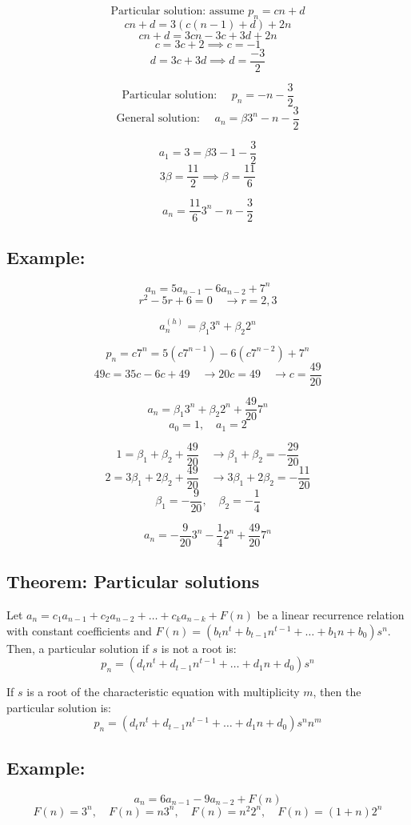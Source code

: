 \documentclass[11pt]{article}
\begin{document}
\[
\text{Particular solution: assume } p_n = cn + d
\]
\[
cn + d = 3(c(n-1) + d) + 2n
\]
\[
cn + d = 3cn - 3c + 3d + 2n
\]
\[
c = 3c + 2 \implies c = -1
\]
\[
d = 3c + 3d \implies d = \frac{-3}{2}
\]

\[
\text{Particular solution: } \quad p_n = -n - \frac{3}{2}
\]
\[
\text{General solution: } \quad a_n = \beta 3^n - n - \frac{3}{2}
\]

\[
a_1 = 3 = \beta 3 - 1 - \frac{3}{2} 
\]
\[
3 \beta = \frac{11}{2} \implies \beta = \frac{11}{6}
\]

\[
a_n = \frac{11}{6} 3^n - n - \frac{3}{2}
\]

\subsection*{Example:}
\[
a_n = 5 a_{n-1} - 6 a_{n-2} + 7^n
\]
\[
r^2 - 5r + 6 = 0 \quad \rightarrow r = 2, 3
\]

\[
a_n^{(h)} = \beta_1 3^n + \beta_2 2^n
\]

\[
p_n = c 7^n = 5(c 7^{n-1}) - 6(c 7^{n-2}) + 7^n
\]
\[
49c = 35c - 6c + 49 \quad \rightarrow 20c = 49 \quad \rightarrow c = \frac{49}{20}
\]

\[
a_n = \beta_1 3^n + \beta_2 2^n + \frac{49}{20} 7^n
\]
\[
a_0 = 1, \quad a_1 = 2
\]

\[
1 = \beta_1 + \beta_2 + \frac{49}{20} \quad \rightarrow \beta_1 + \beta_2 = -\frac{29}{20}
\]
\[
2 = 3 \beta_1 + 2 \beta_2 + \frac{49}{20} \quad \rightarrow 3 \beta_1 + 2 \beta_2 = -\frac{11}{20}
\]
\[
\beta_1 = -\frac{9}{20}, \quad \beta_2 = -\frac{1}{4}
\]

\[
a_n = -\frac{9}{20} 3^n - \frac{1}{4} 2^n + \frac{49}{20} 7^n
\]

\subsection{Theorem: Particular solutions}
Let $a_n = c_1 a_{n-1} + c_2 a_{n-2} + \dots + c_k a_{n-k} + F(n)$ be a linear recurrence relation with constant coefficients and $F(n) = (b_t n^t + b_{t-1} n^{t-1} + \dots + b_1 n + b_0) s^n$.
Then, a particular solution if $s$ is not a root is:
\[
p_n = (d_t n^t + d_{t-1} n^{t-1} + \dots + d_1 n + d_0) s^n
\]

If $s$ is a root of the characteristic equation with multiplicity $m$, then the particular solution is:
\[
p_n = (d_t n^t + d_{t-1} n^{t-1} + \dots + d_1 n + d_0) s^n n^m
\]

\subsection*{Example:}
\[
a_n = 6 a_{n-1} - 9 a_{n-2} + F(n)
\]
\[
F(n) = 3^n, \quad F(n) = n 3^n, \quad F(n) = n^2 2^n, \quad F(n) = (1 + n) 2^n
\]
\end{document}
